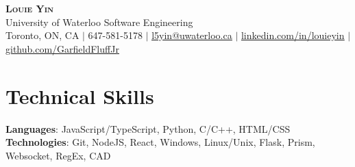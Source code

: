 \documentclass[letterpaper,11pt]{article}
\begin{document}

\begin{center}
    \textbf{\Huge \scshape Louie Yin} \\
    \Large University of Waterloo Software Engineering \\ \vspace{3pt}
    \small Toronto, ON, CA $|$
    \small 647-581-5178 $|$ \href{mailto:l5yin@uwaterloo.ca}{\underline{l5yin@uwaterloo.ca}} $|$ 
    \href{https://www.linkedin.com/in/louieyin/}{\underline{linkedin.com/in/louieyin}} $|$
    \href{https://github.com/GarfieldFluffJr}{\underline{github.com/GarfieldFluffJr}}
\end{center}

\vspace{-12pt}


\section{Technical Skills}
 \begin{itemize}[leftmargin=0.15in, label={}]
    \small{\item{
     \textbf{Languages}{: JavaScript/TypeScript, Python, C/C++, HTML/CSS} \\
     \textbf{Technologies}{: Git, NodeJS, React, Windows, Linux/Unix, Flask, Prism, Websocket, RegEx, CAD} \\
    }}
 \end{itemize}

 \vspace{-10pt}



\end{document}
